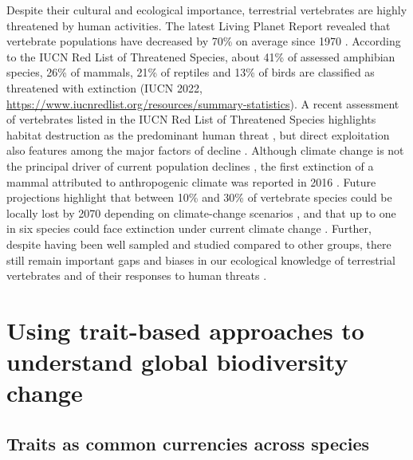 Despite their cultural and ecological importance, terrestrial vertebrates are highly threatened by human activities. The latest Living Planet Report revealed that vertebrate populations have decreased by 70\% on average since 1970 \citep{WWF2020}. According to the IUCN Red List of Threatened Species, about 41\% of assessed amphibian species, 26\% of mammals, 21\% of reptiles and 13\% of birds are classified as threatened with extinction (IUCN 2022, \url{https://www.iucnredlist.org/resources/summary-statistics}). A recent assessment of vertebrates listed in the IUCN Red List of Threatened Species highlights habitat destruction as the predominant human threat \citep{Cox2022}, but direct exploitation also features among the major factors of decline \citep{Monastersky2014}. Although climate change is not the principal driver of current population declines \citep{Caro2022}, the first extinction of a mammal attributed to anthropogenic climate was reported in 2016 \citep{Watson2016}. Future projections highlight that between 10\% and 30\% of vertebrate species could be locally lost by 2070 depending on climate-change scenarios \citep{Newbold2018}, and that up to one in six species could face extinction under current climate change \citep{Urban2015}. Further, despite having been well sampled and studied compared to other groups, there still remain important gaps and biases in our ecological knowledge of terrestrial vertebrates and of their responses to human threats \citep{Meyer2015, Meiri2016, Hevia2017, Oliver2021}.


\section{Using trait-based approaches to understand global biodiversity change}

\subsection{Traits as common currencies across species}

